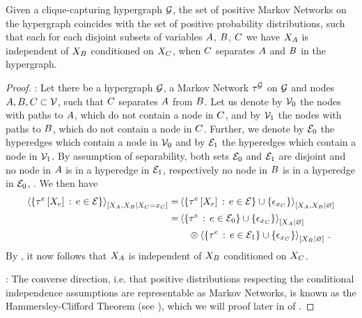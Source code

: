 \begin{theorem}
    \label{the:condIndMN}
    Given a clique-capturing hypergraph $\mathcal{G}$, the set of positive Markov Networks on the hypergraph coincides with the set of positive probability distributions, such that each for each disjoint subsets of variables $A$, $B$, $C$ we have $X_{A}$ is independent of $X_{B}$ conditioned on $X_{C}$, when $C$ separates $A$ and $B$ in the hypergraph. %
\end{theorem}
\begin{proof}
    \proofrightsymbol:
    Let there be a hypergraph $\mathcal{G}$, a Markov Network $\tau^{\mathcal{G}}$ on $\mathcal{G}$ and nodes $A,B,C \subset \mathcal{V}$, such that $C$ separates $A$ from $B$.
    Let us denote by $\mathcal{V}_0$ the nodes with paths to $A$, which do not contain a node in $C$, and by $\mathcal{V}_1$ the nodes with paths to $B$, which do not contain a node in $C$.
    Further, we denote by $\mathcal{E}_0$ the hyperedges which contain a node in $\mathcal{V}_0$ and by $\mathcal{E}_1$ the hyperedges which contain a node in $\mathcal{V}_1$.
    By assumption of separability, both sets $\mathcal{E}_0$ and $\mathcal{E}_1$ are disjoint and no node in $A$ is in a hyperedge in $\mathcal{E}_1$, respectively no node in $B$ is in a hyperedge in $\mathcal{E}_0$, .
    We then have
    \begin{align*}
        \left\langle \left\{\tau^{e}\left[X_{e}\right]\,:\,e\in\mathcal{E}\right\}\right\rangle_{\left[ X_{A},X_{B} | X_{C}=x_{C} \right]}
        = & \left\langle \left\{\tau^{e}\left[X_{e}\right]\,:\,e\in\mathcal{E}\right\}\cup\{\epsilon_{x_{C}}\}\right\rangle_{\left[ X_{A},X_{B} | \varnothing \right]} \\
        = &  \left\langle \{\tau^{e}\,:\,e\in\mathcal{E}_0\}\cup\{\epsilon_{x_{C}}\}\right\rangle_{\left[ X_{A} | \varnothing \right]} \\
        & \quad \otimes \left\langle \{\tau^{e}\,:\,e\in\mathcal{E}_1\}\cup\{\epsilon_{x_{C}}\}\right\rangle_{\left[ X_{B} | \varnothing \right]} \, .
    \end{align*}
    By , it now follows that $X_{A}$ is independent of $X_{B}$ conditioned on $X_{C}$.

    \proofleftsymbol:
    The converse direction, i.e. that positive distributions respecting the conditional independence assumptions are representable as Markov Networks, is known as the Hammersley-Clifford Theorem (see \cite{clifford_markov_1971}), which we will proof later in  of .
\end{proof}

